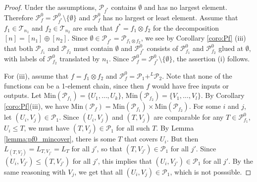 \documentclass[12pt]{article}
\theoremstyle{definition}
\theoremstyle{remark}
\def\indep{+^L}
\def\Te{\mathcal T}
\def\Pe{\mathcal P}
\begin{document}
\begin{proof} Under the assumptions, $\Pe_{f^*}$ contains $\emptyset$ and has no largest
element.  Therefore
$\Pe_f^0=\Pe_{f^*}^0\setminus \{\emptyset\}$ and $\Pe_f^0$ has no largest or least
element.
Assume that $f_1\in \Te_{n_1}$ and $f_2\in \Te_{n_2}$ are such that $f^*=f_1\otimes f_2$
for the decomposition $[n]=[n_1]\oplus [n_2]$. Since $\emptyset \in
\Pe_{f^*}=\Pe_{f_1\otimes f_2}$, we see by Corollary \ref{coro:Pf} (iii) that both $\Pe_{f_1}$ and $\Pe_{f_2}$ must
contain $\emptyset$ and  $\Pe_{f^*}^0$ consists
of $\Pe_{f_1}^0$ and $\Pe_{f_2}^0$ glued at $\emptyset$, with labels of $\Pe_{f_2}^0$
translated by $n_1$. Since $\Pe_f^0=\Pe^0_{f^*}\setminus \{\emptyset\}$, the assertion (i) 
follows.  

For (iii), assume that $f=f_1\otimes f_2$ and $\Pe_f^0=\Pe_1\indep \Pe_2$. Note that none of
the functions can be a 1-element chain, since then $f$ would have free inputs or outputs. Let
$\mathrm{Min}(\Pe_{f_1})=\{U_1,\dots,U_k\}$,  $\mathrm{Min}(\Pe_{f_2})=\{V_1,\dots,V_l\}$.
By Corollary \ref{coro:Pf}(iii), we have  $\mathrm{Min}(\Pe_{f})=\mathrm{Min}(\Pe_{f_1})\times \mathrm{Min}(\Pe_{f_2})$. 
For some $i$ and $j$, let $(U_i,V_j)\in \Pe_1$. Since $(U_i,V_j)$ and $(T,V_j)$ are
comparable for any $T\in \Pe^0_{f_1}$, $U_i\le T$, we must have $(T,V_j)\in \Pe_1$ for all
such $T$. By Lemma \ref{lemma:pf0_mincover}, there is some $T$ that covers $U_i$. 
But then $L_{(T,V_j)}=L_{T,V_{j'}}=L_T$ for all $j'$, so that $(T,V_{j'})\in \Pe_1$
for all $j'$. Since $(U_i,V_{j'})\le (T,V_{j'})$ for all $j'$, this implies that $(U_i,
V_{j'})\in \Pe_1$ for all $j'$. By the same reasoning with $V_j$, we get that all $(U_i,
V_j)\in \Pe_1$, which is not posssible. 



\end{proof}
\end{document}
